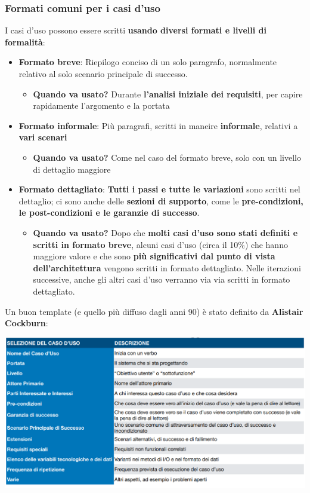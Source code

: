 \documentclass[12pt]{article}
\begin{document}
\subsubsection{Formati comuni per i casi d'uso}
I casi d'uso possono essere scritti \textbf{usando diversi formati e livelli di formalità}:
\begin{itemize}
    \item \textbf{Formato breve}: Riepilogo conciso di un solo paragrafo, normalmente relativo al solo scenario principale di successo.
    \begin{itemize}
        \item \textbf{Quando va usato?} Durante \textbf{l'analisi iniziale dei requisiti}, per capire rapidamente l'argomento e la portata
    \end{itemize}
    \item \textbf{Formato informale}: Più paragrafi, scritti in maneire \textbf{informale}, relativi a \textbf{vari scenari}
    \begin{itemize}
        \item \textbf{Quando va usato?} Come nel caso del formato breve, solo con un livello di dettaglio maggiore
    \end{itemize}
    \item \textbf{Formato dettagliato}: \textbf{Tutti i passi e tutte le variazioni} sono scritti nel dettaglio; ci sono anche delle \textbf{sezioni di supporto}, come le \textbf{pre-condizioni, le post-condizioni e le garanzie di successo}.
    \begin{itemize}
        \item \textbf{Quando va usato?} Dopo che \textbf{molti casi d'uso sono stati definiti e scritti in formato breve}, alcuni casi d'uso (circa il 10\%) che hanno maggiore valore e che sono \textbf{più significativi dal punto di vista dell'architettura} vengono scritti in formato dettagliato. Nelle iterazioni successive, anche gli altri casi d'uso verranno via via scritti in formato dettagliato.
    \end{itemize}
\end{itemize}
Un buon template (e quello più diffuso dagli anni 90) è stato definito da \textbf{Alistair Cockburn}:
\begin{center}
    \includegraphics[width = 1.05\textwidth]{Images/32.PNG}
\end{center}
\end{document}
